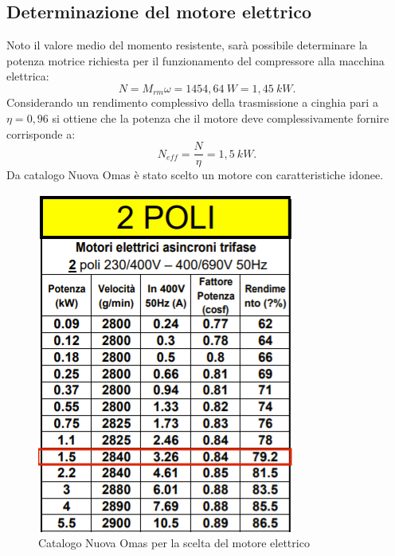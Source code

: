 \subsection{Determinazione del motore elettrico}
Noto il valore medio del momento resistente, sarà possibile determinare la potenza motrice richiesta per il funzionamento del compressore alla macchina elettrica: 
\begin{equation}
    N=M_{rm}\omega=1454,64\ W=1,45\ kW.
\end{equation}
Considerando un rendimento complessivo della trasmissione a cinghia pari a $\eta=0,96$ si ottiene che la potenza che il motore deve complessivamente fornire corrisponde a: 
\begin{equation}
    N_{eff}=\frac{N}{\eta}=1,5\ kW.
\end{equation}
Da catalogo Nuova Omas è stato scelto un motore con caratteristiche idonee. 
\begin{figure}[h]
    \centering
    \includegraphics[scale=0.6]{Immagini/CatalogoMotoreElettrico.png}
    \caption{Catalogo Nuova Omas per la scelta del motore elettrico}
    \label{fig:CatalogoMotoreElettrico}
\end{figure}
